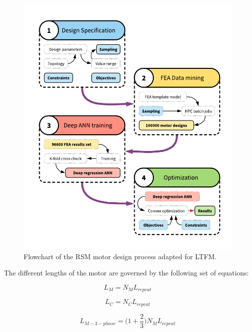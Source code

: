         
        \begin{figure}[!ht]
            \centering
            \includegraphics[width=5in]{chap4/images3/TFM_process_summary.pdf}
            \caption{Flowchart of the RSM motor design process adapted for \acs{LTFM}.}
            \label{fig:chapter/rsm/LTFM/design process}
        \end{figure}
        
        
        The different lengths of the motor are governed by the following set of equations:
        
        
        \begin{equation}
            L_M = N_M L_{repeat}
            \label{eq:chap/rsm/LTFM/L_M}
        \end{equation}
        
        
        \begin{equation}
            L_C = N_C L_{repeat}
            \label{eq:chap/rsm/LTFM/L_C}
        \end{equation}
        
        
        \begin{equation}
            L_{M-3-phase} = \bigg(1+\frac{2}{3} \bigg) N_M L_{repeat} 
            \label{eq:chap/rsm/LTFM/L_M_3phase}
        \end{equation}
        
